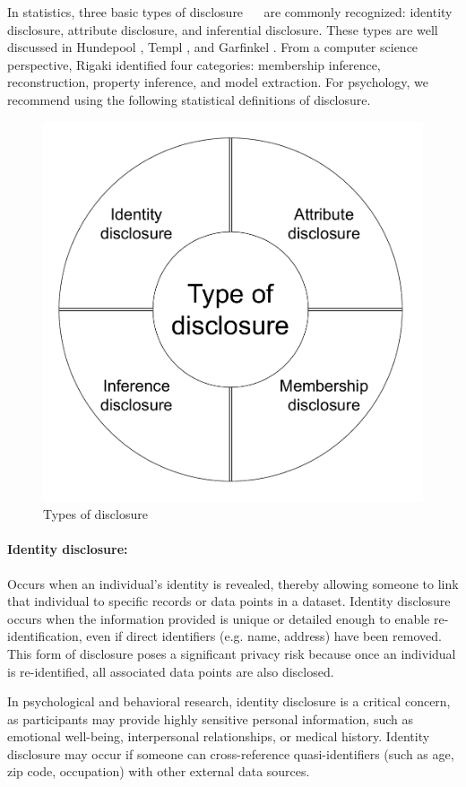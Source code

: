 \documentclass{article}
\begin{document}

In statistics, three basic types of disclosure \cite{1993_Lambert}~\cite{1989_Duncan}~\cite{1977_Dalenius} are commonly recognized: identity disclosure, attribute disclosure, and inferential disclosure. These types are well discussed in Hundepool \cite{2012_Hundepool}, Templ \cite{2017_Templ}, and Garfinkel \cite{2023_NIST}. From a computer science perspective, Rigaki \cite{2024_Rigaki} identified four categories: membership inference, reconstruction, property inference, and model extraction. For psychology, we recommend using the following statistical definitions of disclosure.

\begin{figure}[H]
    \centering
    \includegraphics[width=0.5\linewidth]{Drawio/Type_of_disclosure.drawio.pdf}
    \caption{Types of disclosure}
    \label{fig:Types_of_disclosure}
\end{figure}

\paragraph{Identity disclosure:} 
Occurs when an individual’s identity is revealed, thereby allowing someone to link that individual to specific records or data points in a dataset. Identity disclosure occurs when the information provided is unique or detailed enough to enable re-identification, even if direct identifiers (e.g. name, address) have been removed. This form of disclosure poses a significant privacy risk because once an individual is re-identified, all associated data points are also disclosed.

In psychological and behavioral research, identity disclosure is a critical concern, as participants may provide highly sensitive personal information, such as emotional well-being, interpersonal relationships, or medical history. Identity disclosure may occur if someone can cross-reference quasi-identifiers (such as age, zip code, occupation) with other external data sources.
\end{document}
